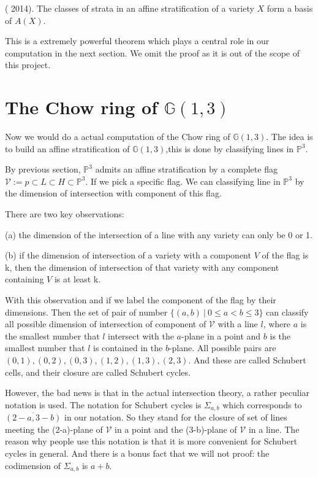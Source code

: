 \documentclass[12pt]{article}
\begin{document}
\begin{thm}
    (\cite{totaro_2014} 2014). The classes of strata in an affine stratification of a variety $X$ form a basis of $A(X)$.
\end{thm}

This is a extremely powerful theorem which plays a central role in our computation in the next section. We omit the proof as it is out of the scope of this project.











\section{The Chow ring of $\mathbb{G}(1,3)$}

Now we would do a actual computation of the Chow ring of $\mathbb{G}(1,3)$. The idea is to build an affine stratification of $\mathbb{G}(1,3)$,this is done by classifying lines in $\mathbb{P}^{3}$.

By previous section, $\mathbb{P}^{3}$ admits an affine stratification by a complete flag $\mathcal{V}:= {p}\subset L \subset H \subset \mathbb{P}^{3}$. If we pick a specific flag. We can classifying line in $\mathbb{P}^{3}$ by the dimension of intersection with component of this flag. 

There are two key observations: 

(a) the dimension of the intersection of a line with any variety can only be 0 or 1.

(b) if the dimension of intersection of a variety with a component $V$ of the flag is k, then the dimension of intersection of that variety with any component containing $V$ is at least k.

With this observation and if we label the component of the flag by their dimensions. Then the set of  pair of number $\{(a,b) \ | \ 0 \leq a < b \leq 3\} $ can classify all possible dimension of intersection of component of $\mathcal{V}$ with a line $l$, where $a$ is the smallest number that $l$ intersect with the $a$-plane in a point and $b$ is the smallest number that $l$ is contained in the $b$-plane. All possible pairs are $ (0,1), (0,2), (0,3), (1,2), (1,3), (2,3)$. And these are called Schubert cells, and their closure are called Schubert cycles.

However, the bad news is that in the actual intersection theory, a rather peculiar notation is used. The notation for Schubert cycles is $\Sigma_{a,b} $ which corresponds to $\overline{(2-a, 3-b)}$ in our notation. So they stand for the closure of set of lines meeting the (2-a)-plane of $\mathcal{V}$ in a point and the (3-b)-plane of $\mathcal{V}$ in a line. The reason why people use this notation is that it is more convenient for Schubert cycles in general. And there is a bonus fact that we will not proof: the codimension of $\Sigma_{a,b} $ is $a + b$.
\end{document}
